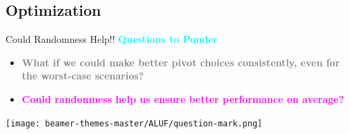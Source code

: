 \documentclass{beamer}
\begin{document}
\subsection{Optimization}
\begin{frame}{Could Randomness Help!!}
     \vspace{0.8cm}
    \centering
    {\Large \textbf{\textcolor{cyan}{Questions to Ponder}}} \\
    \vspace{0.1cm}
    \begin{itemize}
        \item \textbf{\textcolor{gray}{What if we could make better pivot choices consistently, even for the worst-case scenarios?}}
        \vspace{0.3cm}
         \pause
        \item \textbf{\textcolor{magenta}{Could randomness help us ensure better performance on average?}}
    \end{itemize}
    \vspace{0.1cm}
    \centering
    \texttt{[image: beamer-themes-master/ALUF/question-mark.png]}
\end{frame}
\end{document}
